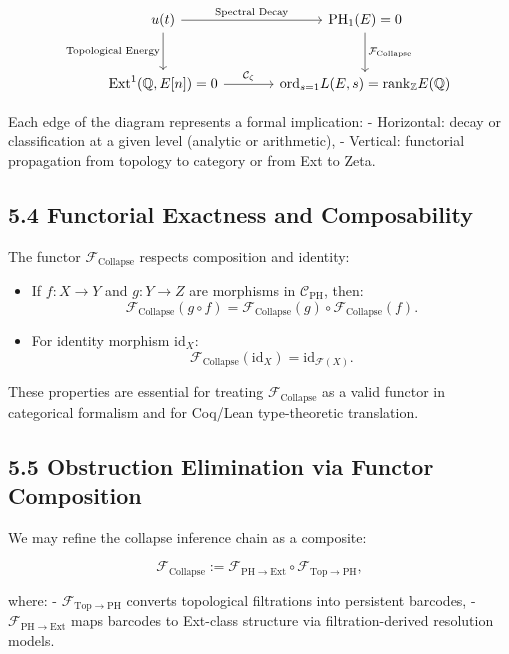 \documentclass[11pt]{article}
\DeclareMathOperator{\Ext}{Ext}
\DeclareMathOperator{\PH}{PH}
\newcommand{\QQ}{\mathbb{Q}}
\newcommand{\ZZ}{\mathbb{Z}}
\begin{document}
\[
\begin{tikzcd}[row sep=large, column sep=large]
u(t) \arrow[r, "\text{Spectral Decay}"] \arrow[d, swap, "\text{Topological Energy}"]
& \PH_1(E) = 0 \arrow[d, "\mathcal{F}_{\mathrm{Collapse}}"] \\
\Ext^1(\QQ,E[n]) = 0 \arrow[r, "\mathcal{C}_\zeta"]
& \mathrm{ord}_{s=1} L(E,s) = \mathrm{rank}_{\ZZ} E(\QQ)
\end{tikzcd}
\]

Each edge of the diagram represents a formal implication:
- Horizontal: decay or classification at a given level (analytic or arithmetic),
- Vertical: functorial propagation from topology to category or from Ext to Zeta.

\subsection{5.4 Functorial Exactness and Composability}

The functor $\mathcal{F}_{\mathrm{Collapse}}$ respects composition and identity:

\begin{itemize}
  \item If $f: X \to Y$ and $g: Y \to Z$ are morphisms in $\mathcal{C}_{\mathrm{PH}}$, then:
  \[
  \mathcal{F}_{\mathrm{Collapse}}(g \circ f) = \mathcal{F}_{\mathrm{Collapse}}(g) \circ \mathcal{F}_{\mathrm{Collapse}}(f).
  \]
  \item For identity morphism $\mathrm{id}_X$:
  \[
  \mathcal{F}_{\mathrm{Collapse}}(\mathrm{id}_X) = \mathrm{id}_{\mathcal{F}(X)}.
  \]
\end{itemize}

These properties are essential for treating $\mathcal{F}_{\mathrm{Collapse}}$ as a valid functor in categorical formalism and for Coq/Lean type-theoretic translation.

\subsection{5.5 Obstruction Elimination via Functor Composition}

We may refine the collapse inference chain as a composite:

\[
\mathcal{F}_{\mathrm{Collapse}} := \mathcal{F}_{\mathrm{PH} \to \mathrm{Ext}} \circ \mathcal{F}_{\mathrm{Top} \to \mathrm{PH}},
\]

where:
- $\mathcal{F}_{\mathrm{Top} \to \mathrm{PH}}$ converts topological filtrations into persistent barcodes,
- $\mathcal{F}_{\mathrm{PH} \to \mathrm{Ext}}$ maps barcodes to Ext-class structure via filtration-derived resolution models.
\end{document}
